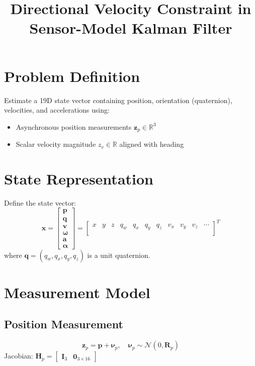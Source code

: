 \documentclass{article}
\begin{document}
	\title{Directional Velocity Constraint in Sensor-Model Kalman Filter}
	\maketitle

	\section{Problem Definition}
	Estimate a 19D state vector containing position, orientation (quaternion), velocities, and accelerations using:
	\begin{itemize}
		\item Asynchronous position measurements $\mathbf{z}_p \in \mathbb{R}^3$
		\item Scalar velocity magnitude $z_v \in \mathbb{R}$ aligned with heading
	\end{itemize}

	\section{State Representation}
	Define the state vector:
	\[
	\mathbf{x} = \begin{bmatrix}
		\mathbf{p} \\ \mathbf{q} \\ \mathbf{v} \\ \boldsymbol{\omega} \\ \mathbf{a} \\ \boldsymbol{\alpha}
	\end{bmatrix} = \begin{bmatrix}
		x & y & z & q_w & q_x & q_y & q_z & v_x & v_y & v_z & \cdots\\
	\end{bmatrix}^T
	\]
	where $\mathbf{q} = (q_w, q_x, q_y, q_z)$ is a unit quaternion.

	\section{Measurement Model}
	\subsection{Position Measurement}
	\[
	\mathbf{z}_p = \mathbf{p} + \boldsymbol{\nu}_p,\quad \boldsymbol{\nu}_p \sim \mathcal{N}(0,\mathbf{R}_p)
	\]
	Jacobian: $\mathbf{H}_p = \begin{bmatrix}\mathbf{I}_3 & \mathbf{0}_{3\times16}\end{bmatrix}$
\end{document}
